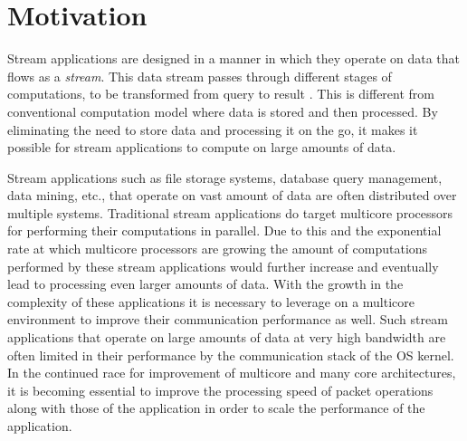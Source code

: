 \documentclass[conference]{IEEEtran}
\begin{document}


%
\IEEEpeerreviewmaketitle

\section{Motivation}

Stream applications are designed in a manner in which they operate on data that flows as a \textit{stream}. This data stream passes through different stages of computations, to be transformed from query to result \cite{Thies:2002:SLS:647478.727935} \cite{Halbwachs91thesynchronous} \cite{Stephens95asurvey}. This is different from conventional computation model where data is stored and then processed. By eliminating the need to store data and processing it on the go, it makes it possible for stream applications to compute on large amounts of data.

Stream applications such as file storage systems, database query management, data mining, etc., that operate on vast amount of data are often distributed over multiple systems. Traditional stream applications do target multicore processors for performing their computations in parallel. Due to this and the exponential rate at which multicore processors are growing the amount of computations performed by these stream applications would further increase and eventually lead to processing even larger amounts of data. With the growth in the complexity of these applications it is necessary to leverage on a multicore environment to improve their communication performance as well. Such stream applications that operate on large amounts of data at very high bandwidth are often limited in their performance by the communication stack of the OS kernel\cite{Wu:2007:PPB:1323954.1323957}\cite{Wu:2007:PAL:1227865.1228021}\cite{Dobrescu09routebricks:exploiting}\cite{Han:2010:PGS:1851275.1851207}\cite{Kohler2000}. In the continued race for improvement of multicore and many core architectures, it is becoming essential to improve the processing speed of packet operations along with those of the application in order to scale the performance of the application.
\end{document}
